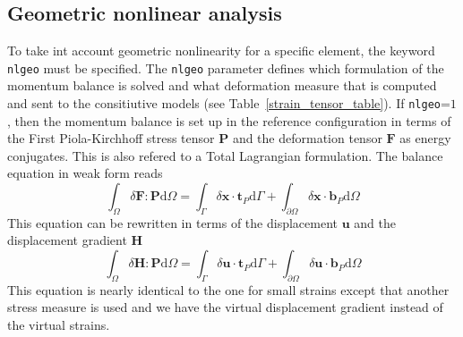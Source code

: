 \documentclass[a4paper]{article}
\newcommand{\param}[1]{\texttt{#1}} %
\begin{document}
\subsection{Geometric nonlinear analysis}
To take int account geometric nonlinearity for a specific element, the keyword \param{nlgeo} must be specified. The \param{nlgeo} parameter defines which formulation of the momentum balance is solved and what deformation measure that is computed and sent to the consitiutive models (see Table~\ref{strain_tensor_table}). 
If \param{nlgeo}=$1$, then the momentum balance is set up in the reference configuration in terms of the First Piola-Kirchhoff stress tensor $\mathbf{P}$ and the deformation tensor $\mathbf{F}$ as energy conjugates. This is also refered to a Total Lagrangian formulation. The balance equation in weak form reads
\begin{equation}
	\int_{\Omega} \delta \mathbf{F} : \mathbf{P} \mathrm{d} \Omega = \int_{\Gamma} \delta \mathbf{x} \cdot \mathbf{t}_P  \mathrm{d} \Gamma
	+ \int_{\partial \Omega} \delta \mathbf{x} \cdot \mathbf{b}_P  \mathrm{d} \Omega
\end{equation} 
This equation can be rewritten in terms of the displacement $\mathbf{u}$ and the displacement gradient $\mathbf{H}$ 
%
\begin{equation}
	\int_{\Omega} \delta \mathbf{H} : \mathbf{P} \mathrm{d} \Omega = \int_{\Gamma} \delta \mathbf{u} \cdot \mathbf{t}_P  \mathrm{d} \Gamma
	+ \int_{\partial \Omega} \delta \mathbf{u} \cdot \mathbf{b}_P  \mathrm{d} \Omega
\end{equation} 
This equation is nearly identical to the one for small strains except that another stress measure is used and we have the virtual displacement gradient 
instead of the virtual strains.
\end{document}
